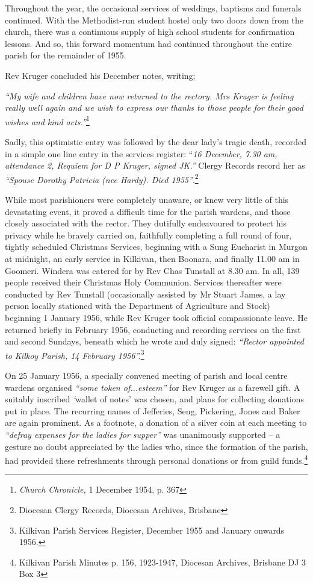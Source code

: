 Throughout the year, the occasional services of weddings, baptisms and funerals continued. With the Methodist-run student hostel only two doors down from the church, there was a continuous supply of high school students for confirmation lessons. And so, this forward momentum had continued throughout the entire parish for the remainder of 1955.



Rev Kruger concluded his December notes, writing;



\emph{``My wife and children have now returned to the rectory. Mrs Kruger is feeling really well again and we wish to express our thanks to those people for their good wishes and kind acts.''}\footnote{\emph{Church Chronicle,} 1 December 1954, p. 367}


\smallskip


Sadly, this optimistic entry was followed by the dear lady's tragic death, recorded in a simple one line entry in the services register: ``\emph{16 December, 7.30 am, attendance 2, Requiem for D P Kruger, signed JK.''} Clergy Records record her as \emph{``Spouse Dorothy Patricia (nee Hardy). Died 1955''}.\footnote{Diocesan Clergy Records, Diocesan Archives, Brisbane}


\smallskip


While most parishioners were completely unaware, or knew very little of this devastating event, it proved a difficult time for the parish wardens, and those closely associated with the rector. They dutifully endeavoured to protect his privacy while he bravely carried on, faithfully completing a full round of four, tightly scheduled Christmas Services, beginning with a Sung Eucharist in Murgon at midnight, an early service in Kilkivan, then Boonara, and finally 11.00 am in Goomeri. Windera was catered for by Rev Chas Tunstall at 8.30 am. In all, 139 people received their Christmas Holy Communion. Services thereafter were conducted by Rev Tunstall (occasionally assisted by Mr Stuart James, a lay person locally stationed with the Department of Agriculture and Stock) beginning 1 January 1956, while Rev Kruger took official compassionate leave. He returned briefly in February 1956, conducting and recording services on the first and second Sundays, beneath which he wrote and duly signed: \emph{``Rector appointed to Kilkoy Parish, 14 February 1956''.}\footnote{Kilkivan Parish Services Register, December 1955 and January onwards 1956.}


On 25 January 1956, a specially convened meeting of parish and local centre wardens organised \emph{``some token of...esteem''} for Rev Kruger as a farewell gift. A suitably inscribed \emph{`}wallet of notes' was chosen, and plans for collecting donations put in place. The recurring names of Jefferies, Seng, Pickering, Jones and Baker are again prominent. As a footnote, a donation of a silver coin at each meeting to \emph{``defray expenses for the ladies for supper''} was unanimously supported -- a gesture no doubt appreciated by the ladies who, since the formation of the parish, had provided these refreshments through personal donations or from guild funds.\footnote{Kilkivan Parish Minutes p. 156, 1923-1947, Diocesan Archives, Brisbane DJ 3 Box 3}


